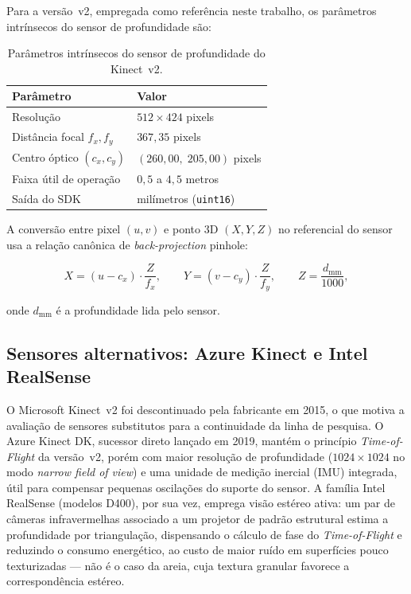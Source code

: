Para a versão~v2, empregada como referência neste trabalho, os
parâmetros intrínsecos do sensor de profundidade são:

\begin{table}[!ht]
\centering
\caption{Parâmetros intrínsecos do sensor de profundidade do Kinect~v2.}
\label{tab:intrinsecos}
\begin{tabular}{ll}
\toprule
\textbf{Parâmetro} & \textbf{Valor} \\
\midrule
Resolução                  & $512 \times 424$ pixels \\
Distância focal $f_x, f_y$ & $367{,}35$ pixels \\
Centro óptico $(c_x, c_y)$ & $(260{,}00,\; 205{,}00)$ pixels \\
Faixa útil de operação     & $0{,}5$ a $4{,}5$ metros \\
Saída do SDK               & milímetros (\texttt{uint16}) \\
\bottomrule
\end{tabular}
\end{table}

A conversão entre pixel $(u, v)$ e ponto 3D $(X, Y, Z)$ no referencial
do sensor usa a relação canônica de \textit{back-projection} pinhole:

\begin{equation}
\label{eq:backproj}
X = (u - c_x) \cdot \frac{Z}{f_x}, \qquad
Y = (v - c_y) \cdot \frac{Z}{f_y}, \qquad
Z = \frac{d_{\text{mm}}}{1000},
\end{equation}

\noindent onde $d_{\text{mm}}$ é a profundidade lida pelo sensor.

\subsection{Sensores alternativos: Azure Kinect e Intel RealSense}
\label{subsec:sensores-alt}

O Microsoft Kinect~v2 foi descontinuado pela fabricante em 2015, o que
motiva a avaliação de sensores substitutos para a continuidade da linha
de pesquisa. O Azure Kinect DK, sucessor direto lançado em
2019, mantém o princípio \textit{Time-of-Flight} da versão~v2, porém com
maior resolução de profundidade ($1024 \times 1024$ no modo
\textit{narrow field of view}) e uma unidade de medição inercial (IMU)
integrada, útil para compensar pequenas oscilações do suporte do sensor.
A família Intel RealSense (modelos D400), por sua vez, emprega
visão estéreo ativa: um par de câmeras infravermelhas associado
a um projetor de padrão estrutural estima a profundidade por
triangulação, dispensando o cálculo de fase do \textit{Time-of-Flight} e
reduzindo o consumo energético, ao custo de maior ruído em superfícies
pouco texturizadas — não é o caso da areia, cuja textura granular
favorece a correspondência estéreo.

